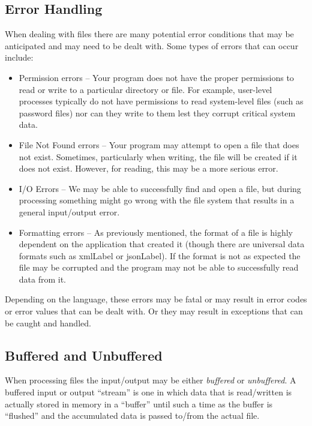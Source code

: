 \subsection{Error Handling}

When dealing with files there are many potential error
conditions that may be anticipated and may need to be
dealt with.  Some types of errors that can occur include:

\begin{itemize}
  \item Permission errors -- Your program does not have
  	the proper permissions to read or write to a particular
	directory or file.  For example, user-level processes
	typically do not have permissions to read system-level
	files (such as password files) nor can they write to them
	lest they corrupt critical system data.  
  \item File Not Found errors -- Your program may attempt
  	to open a file that does not exist.  Sometimes, particularly
	when writing, the file will be created if it does not 
	exist.  However, for reading, this may be a more
	serious error.
  \item I/O Errors -- We may be able to successfully find
  	and open a file, but during processing something might
	go wrong with the file system that results in a general
	input/output error.
  \item Formatting errors -- As previously mentioned, the
  	format of a file is highly dependent on the application
	that created it (though there are universal data formats
	such as \gls{xmlLabel} or \gls{jsonLabel}).  If the
	format is not as expected the file may be corrupted and
	the program may not be able to successfully read 
	data from it.
\end{itemize}

Depending on the language, these errors may be fatal or may
result in error codes or error values that can be dealt with.
Or they may result in exceptions that can be caught and handled.

\subsection{Buffered and Unbuffered}

When processing files the input/output may be either 
\emph{buffered} or \emph{unbuffered}.  A buffered input or
output ``stream'' is one in which data that is read/written
is actually stored in memory in a ``buffer'' until such a 
time as the buffer is ``flushed'' and the accumulated data
is passed to/from the actual file.  

